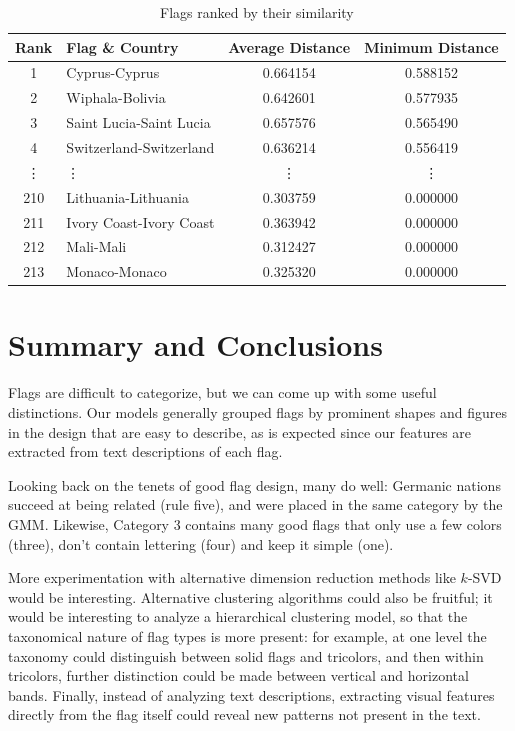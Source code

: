 \documentclass[11pt]{amsart}
\begin{document}
\begin{table}[!ht]
    \centering
    \begin{tabular}{clcc}
        \hline
        \textbf{Rank} & \textbf{Flag \& Country} & \textbf{Average Distance} & \textbf{Minimum Distance} \\
        \hline
        1 & Cyprus-Cyprus & 0.664154 & 0.588152 \\
        2 & Wiphala-Bolivia & 0.642601 & 0.577935 \\
        3 & Saint Lucia-Saint Lucia & 0.657576 & 0.565490 \\
        4 & Switzerland-Switzerland & 0.636214 & 0.556419 \\
        \vdots & \vdots & \vdots & \vdots \\
        210 & Lithuania-Lithuania & 0.303759 & 0.000000 \\
        211 & Ivory Coast-Ivory Coast & 0.363942 & 0.000000 \\
        212 & Mali-Mali & 0.312427 & 0.000000 \\
        213 & Monaco-Monaco & 0.325320 & 0.000000 \\
        \hline
    \end{tabular}
    \caption{Flags ranked by their similarity}
    \label{tab:similar-flags}
\end{table}


\section{Summary and Conclusions}\label{sec:conclusions}

Flags are difficult to categorize, but we can come up with some useful
distinctions. Our models generally grouped flags by prominent shapes and figures
in the design that are easy to describe, as is expected since our features are
extracted from text descriptions of each flag.

Looking back on the tenets of good flag design, many do well: Germanic nations
succeed at being related (rule five), and were placed in the same category by
the GMM. Likewise, Category 3 contains many good flags that only use a few
colors (three), don't contain lettering (four) and keep it simple (one).

More experimentation with alternative dimension reduction methods like \(k\)-SVD
would be interesting. Alternative clustering algorithms could also be fruitful;
it would be interesting to analyze a hierarchical clustering model, so that the
taxonomical nature of flag types is more present: for example, at one level the
taxonomy could distinguish between solid flags and tricolors, and then within
tricolors, further distinction could be made between vertical and horizontal
bands. Finally, instead of analyzing text descriptions, extracting visual
features directly from the flag itself could reveal new patterns not present in
the text.
\end{document}
